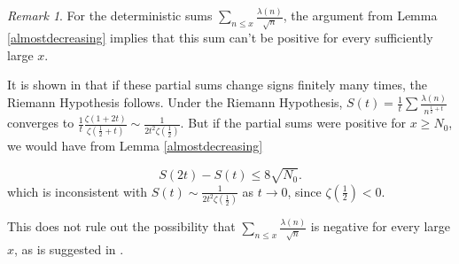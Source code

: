 \documentclass[12pt]{amsart}
\theoremstyle{remark}
\newtheorem{remark}[theorem]{Remark}
\theoremstyle{definition}
\theoremstyle{remark}
\numberwithin{equation}{section}
\begin{document}
\begin{remark} \label{notpositive}
    For the deterministic sums $\sum_{n \le x} \frac{\lambda(n)}{\sqrt{n}}$, the argument from Lemma \ref{almostdecreasing} implies that this sum can't be positive for every sufficiently large $x$.
    
    It is shown in \cite{betweenpolyaandturan} that if these partial sums change signs finitely many times, the Riemann Hypothesis follows. Under the Riemann Hypothesis, $S(t) = \frac{1}{t} \sum \frac{\lambda(n)}{n^{\frac{1}{2}+t}}$ converges to $\frac{1}{t} \frac{\zeta(1+2t)}{\zeta(\frac{1}{2}+t)}\sim \frac{1}{2t^2 \zeta(\frac{1}{2})}$. But if the partial sums were positive for $x \ge N_0$, we would have from Lemma \ref{almostdecreasing}

    $$S(2t)-S(t) \le 8 \sqrt{N_0}.$$
    which is inconsistent with $S(t) \sim \frac{1}{2t^2 \zeta(\frac{1}{2})}$ as $t\rightarrow 0$, since  $\zeta(\frac{1}{2})<0$.

This does not rule out the possibility that $\sum_{n \le x} \frac{\lambda(n)}{\sqrt{n}}$ is negative for every large $x$, as is suggested in \cite{betweenpolyaandturan}.
\end{remark}
    

	{}
	
	
	
\end{document}
